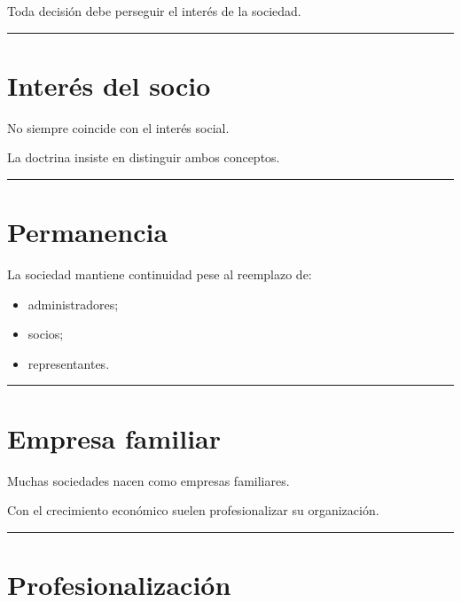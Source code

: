 \documentclass[
  spanish,
  letterpaper,
  DIV=11,
  numbers=noendperiod]{scrartcl}
\providecommand{\tightlist}{%
  \setlength{\itemsep}{0pt}\setlength{\parskip}{0pt}}
\begin{document}
Toda decisión debe perseguir el interés de la sociedad.

\begin{center}\rule{0.5\linewidth}{0.5pt}\end{center}

\section{Interés del socio}\label{interuxe9s-del-socio}

No siempre coincide con el interés social.

La doctrina insiste en distinguir ambos conceptos.

\begin{center}\rule{0.5\linewidth}{0.5pt}\end{center}

\section{Permanencia}\label{permanencia}

La sociedad mantiene continuidad pese al reemplazo de:

\begin{itemize}
\tightlist
\item
  administradores;
\item
  socios;
\item
  representantes.
\end{itemize}

\begin{center}\rule{0.5\linewidth}{0.5pt}\end{center}

\section{Empresa familiar}\label{empresa-familiar}

Muchas sociedades nacen como empresas familiares.

Con el crecimiento económico suelen profesionalizar su organización.

\begin{center}\rule{0.5\linewidth}{0.5pt}\end{center}

\section{Profesionalización}\label{profesionalizaciuxf3n}
\end{document}
